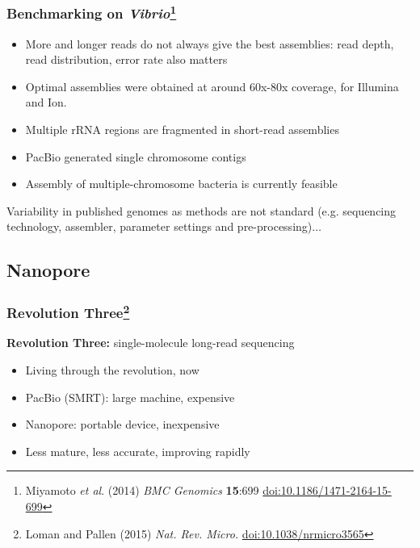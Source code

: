 \begin{frame}
  \frametitle{Benchmarking on \textit{Vibrio}\footnote{\tiny{Miyamoto \textit{et al}. (2014) \textit{BMC Genomics} \textbf{15}:699 \href{http://dx.doi.org/10.1186/1471-2164-15-699}{doi:10.1186/1471-2164-15-699}}}}
  \begin{itemize}
    \item More and longer reads do not always give the best assemblies: read depth, read distribution, error rate also matters
    \item Optimal assemblies were obtained at around 60x-80x coverage, for Illumina and Ion.
    \item Multiple rRNA regions are fragmented in short-read assemblies
    \item PacBio generated single chromosome contigs
    \item Assembly of multiple-chromosome bacteria is currently feasible
  \end{itemize}  
  Variability in published genomes as methods are not standard (e.g. sequencing technology, assembler, parameter settings and pre-processing)$\ldots$
\end{frame}

\subsection{Nanopore}

\begin{frame}
  \frametitle{Revolution Three\footnote{\tiny{Loman and Pallen (2015) \textit{Nat. Rev. Micro.} \href{http://dx.doi.org/10.1038/nrmicro3565}{doi:10.1038/nrmicro3565}}}}
  \textbf{Revolution Three:} single-molecule long-read sequencing
  \begin{itemize}
    \item Living through the revolution, now
    \item PacBio (SMRT): large machine, expensive
    \item Nanopore: portable device, inexpensive
    \item Less mature, less accurate, improving rapidly
  \end{itemize}
\end{frame}

